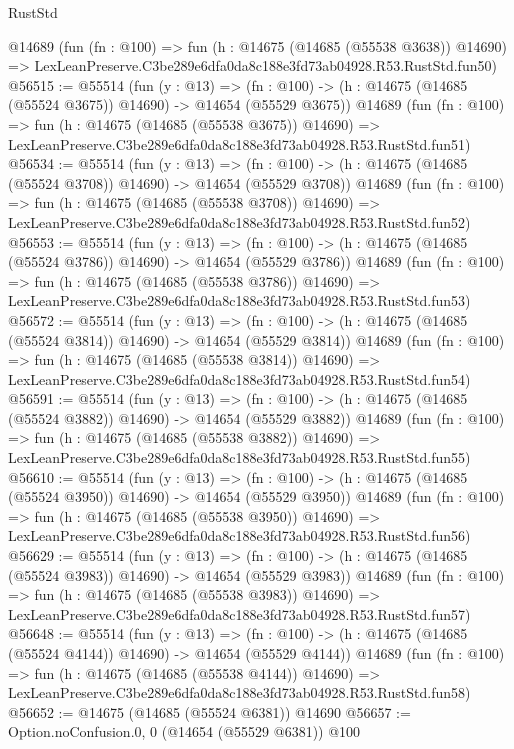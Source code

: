 \begin{lexlean}{RustStd}
\begin{coremodule}
    @14689
    (fun (fn : @100) =>
    fun (h : @14675 (@14685 (@55538 @3638)) @14690) =>
    LexLeanPreserve.C3be289e6dfa0da8c188e3fd73ab04928.R53.RustStd.fun50)
@56515 := @55514
    (fun (y : @13) =>
    (fn : @100) -> (h : @14675 (@14685 (@55524 @3675)) @14690) -> @14654 (@55529 @3675))
    @14689
    (fun (fn : @100) =>
    fun (h : @14675 (@14685 (@55538 @3675)) @14690) =>
    LexLeanPreserve.C3be289e6dfa0da8c188e3fd73ab04928.R53.RustStd.fun51)
@56534 := @55514
    (fun (y : @13) =>
    (fn : @100) -> (h : @14675 (@14685 (@55524 @3708)) @14690) -> @14654 (@55529 @3708))
    @14689
    (fun (fn : @100) =>
    fun (h : @14675 (@14685 (@55538 @3708)) @14690) =>
    LexLeanPreserve.C3be289e6dfa0da8c188e3fd73ab04928.R53.RustStd.fun52)
@56553 := @55514
    (fun (y : @13) =>
    (fn : @100) -> (h : @14675 (@14685 (@55524 @3786)) @14690) -> @14654 (@55529 @3786))
    @14689
    (fun (fn : @100) =>
    fun (h : @14675 (@14685 (@55538 @3786)) @14690) =>
    LexLeanPreserve.C3be289e6dfa0da8c188e3fd73ab04928.R53.RustStd.fun53)
@56572 := @55514
    (fun (y : @13) =>
    (fn : @100) -> (h : @14675 (@14685 (@55524 @3814)) @14690) -> @14654 (@55529 @3814))
    @14689
    (fun (fn : @100) =>
    fun (h : @14675 (@14685 (@55538 @3814)) @14690) =>
    LexLeanPreserve.C3be289e6dfa0da8c188e3fd73ab04928.R53.RustStd.fun54)
@56591 := @55514
    (fun (y : @13) =>
    (fn : @100) -> (h : @14675 (@14685 (@55524 @3882)) @14690) -> @14654 (@55529 @3882))
    @14689
    (fun (fn : @100) =>
    fun (h : @14675 (@14685 (@55538 @3882)) @14690) =>
    LexLeanPreserve.C3be289e6dfa0da8c188e3fd73ab04928.R53.RustStd.fun55)
@56610 := @55514
    (fun (y : @13) =>
    (fn : @100) -> (h : @14675 (@14685 (@55524 @3950)) @14690) -> @14654 (@55529 @3950))
    @14689
    (fun (fn : @100) =>
    fun (h : @14675 (@14685 (@55538 @3950)) @14690) =>
    LexLeanPreserve.C3be289e6dfa0da8c188e3fd73ab04928.R53.RustStd.fun56)
@56629 := @55514
    (fun (y : @13) =>
    (fn : @100) -> (h : @14675 (@14685 (@55524 @3983)) @14690) -> @14654 (@55529 @3983))
    @14689
    (fun (fn : @100) =>
    fun (h : @14675 (@14685 (@55538 @3983)) @14690) =>
    LexLeanPreserve.C3be289e6dfa0da8c188e3fd73ab04928.R53.RustStd.fun57)
@56648 := @55514
    (fun (y : @13) =>
    (fn : @100) -> (h : @14675 (@14685 (@55524 @4144)) @14690) -> @14654 (@55529 @4144))
    @14689
    (fun (fn : @100) =>
    fun (h : @14675 (@14685 (@55538 @4144)) @14690) =>
    LexLeanPreserve.C3be289e6dfa0da8c188e3fd73ab04928.R53.RustStd.fun58)
@56652 := @14675 (@14685 (@55524 @6381)) @14690
@56657 := Option.noConfusion.{0, 0} (@14654 (@55529 @6381)) @100

\end{coremodule}
\end{lexlean}
